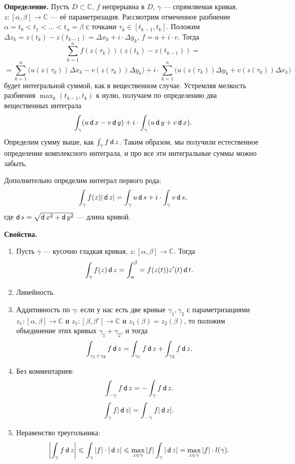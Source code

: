\textbf{Определение.} Пусть $D \subset \mathbb C$, $f$ непрерывна в $D$, $\gamma$ --- спрямляемая кривая, $z: [\alpha, \beta] \to \mathbb C$ --- её параметризация.
Рассмотрим отмеченное разбиение $\alpha = t_0 < t_1 < \dots < t_n = \beta$ с точками $\tau_k \in [t_{k-1}, t_k]$.
Положим $\Delta z_k = z(t_k) - z(t_{k-1}) = \Delta x_k + i \cdot \Delta y_k$, $f = u + i \cdot v$.
Тогда
\[
    \sum_{k=1}^{n} f(z(\tau_k)) (z(t_k) - z(t_{k-1})) = 
\]
\[
    = \sum_{k=1}^{n} \bigg( u(z(\tau_k)) \Delta x_k - v(z(\tau_k)) \Delta y_k \bigg) + i \cdot \sum_{k=1}^{n} \bigg( u(z(\tau_k)) \Delta y_k + v(z(\tau_k)) \Delta x_k \bigg)
\]
будет интегральной суммой, как в вещественном случае.
Устремляя мелкость разбиения $\max_k (t_{k-1}, t_k)$ к нулю, получаем по определению два вещественных интеграла
\[
    \int_\gamma(u \operatorname{\mathsf d} x - v \operatorname{\mathsf d} y) + i \cdot \int_\gamma (u \operatorname{\mathsf d} y + v \operatorname{\mathsf d} x).
\]
Определим сумму выше, как $\int_\gamma f \operatorname{\mathsf d} z$.
Таким образом, мы получили естественное определение комплексного интеграла, и про все эти интегральные суммы можно забыть.

Дополнительно определим интеграл первого рода:
\[
    \int_\gamma f(z) |\operatorname{\mathsf d} z| = \int_\gamma u \operatorname{\mathsf d} s + i \cdot \int_\gamma v \operatorname{\mathsf d} s,
\]
где $\operatorname{\mathsf d} s = \sqrt{\operatorname{\mathsf d} x^2 + \operatorname{\mathsf d} y^2}$ --- длина кривой.

\textbf{Свойства.}
\begin{enumerate}
    \item Пусть $\gamma$ --- кусочно гладкая кривая, $z: [\alpha, \beta] \to \mathbb C$.
        Тогда
        \[
            \int_\gamma f(z) \operatorname{\mathsf d} z = \int_\alpha^\beta = f(z(t)) z'(t) \operatorname{\mathsf d} t.
        \]

    \item Линейность.

    \item Аддитивность по $\gamma$: если у нас есть две кривые $\gamma_1, \gamma_2$ с параметризациями $z_1: [\alpha, \beta] \to \mathbb C$ и $z_1: [\beta, \beta'] \to \mathbb C$ и $z_1(\beta) = z_2(\beta)$, то положим объединение этих кривых $\gamma_1 + \gamma_2$, и тогда
        \[
            \int_{\gamma_1 + \gamma_2} f \operatorname{\mathsf d} z = \int_{\gamma_1} f \operatorname{\mathsf d} z + \int_{\gamma_2} f \operatorname{\mathsf d} z.
        \]

    \item Без комментариев:
        \[
            \int_{-\gamma} f \operatorname{\mathsf d} z = - \int_\gamma f \operatorname{\mathsf d} z.
        \]
        \[
            \int_\gamma f |\operatorname{\mathsf d} z| = \int_{-\gamma} f |\operatorname{\mathsf d} z|.
        \]

    \item Неравенство треугольника:
        \[
            \left| \int_\gamma f \operatorname{\mathsf d} z \right| \leqslant \int_\gamma |f| \cdot |\operatorname{\mathsf d} z| \leqslant \max_{z \in \gamma} |f| \int_\gamma |\operatorname{\mathsf d} z| = \max_{z \in \gamma} |f| \cdot l(\gamma).
        \]
\end{enumerate}

